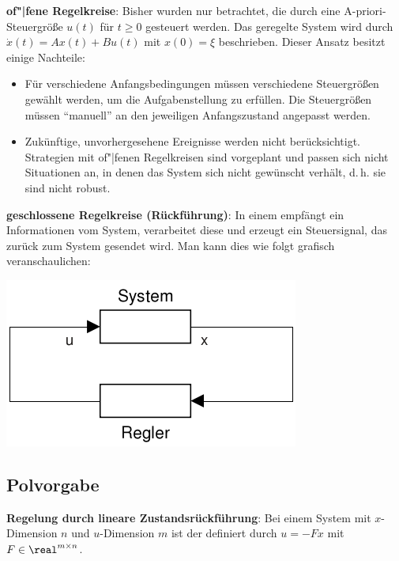 \textbf{of"|fene Regelkreise}:
Bisher wurden nur  betrachtet,
die durch eine A-priori-Steuergröße $u(t)$ für $t \ge 0$ gesteuert werden.
Das geregelte System wird durch $\dot{x}(t) = Ax(t) + Bu(t)$ mit $x(0) = \xi$ beschrieben.
Dieser Ansatz besitzt einige Nachteile:
\begin{itemize}
    \item
    Für verschiedene Anfangsbedingungen müssen verschiedene Steuergrößen gewählt werden,
    um die Aufgabenstellung zu erfüllen.
    Die Steuergrößen müssen "`manuell"' an den jeweiligen Anfangszustand angepasst werden.

    \item
    Zukünftige, unvorhergesehene Ereignisse werden nicht berücksichtigt.
    Strategien mit of"|fenen Regelkreisen sind vorgeplant und passen sich nicht Situationen an,
    in denen das System sich nicht gewünscht verhält, d.\,h. sie sind nicht robust.
\end{itemize}

\linie

\textbf{geschlossene Regelkreise (Rückführung)}:
In einem  empfängt ein
 Informationen vom System,
verarbeitet diese und erzeugt ein Steuersignal, das zurück zum System gesendet wird.
Man kann dies wie folgt grafisch veranschaulichen:

\begin{center}
    \includegraphics[scale=\modelscale]{rueckkopplung}
\end{center}

\pagebreak

\subsection{%
    Polvorgabe%
}

\textbf{Regelung durch lineare Zustandsrückführung}:
Bei einem System mit $x$-Dimension $n$ und $u$-Dimension $m$ ist
der  definiert
durch $u = -Fx$ mit $F \in \real^{m \times n}$.

